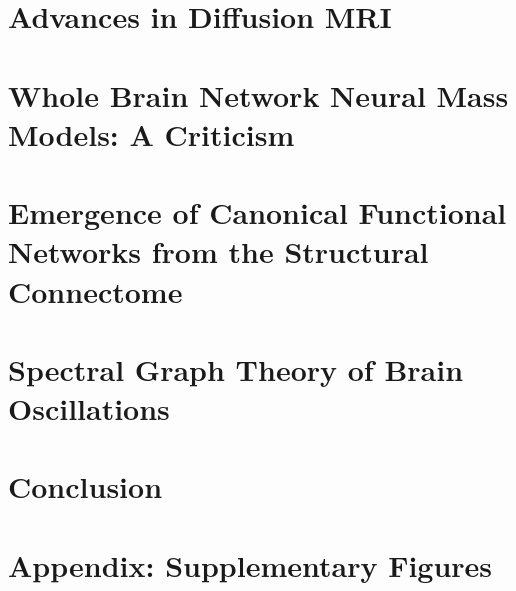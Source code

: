 \documentclass[phd,tocprelim]{cornell}
\begin{document}
\chapter{Advances in Diffusion MRI}
\label{chap:dwi}


\chapter{Whole Brain Network Neural Mass Models: A Criticism}
\label{chap:nmm}


\chapter{Emergence of Canonical Functional Networks from the Structural Connectome}
\label{chap:lap}


\chapter{Spectral Graph Theory of Brain Oscillations}
\label{chap:sgm}


\chapter{Conclusion}
\label{chap:conclusion}


\appendix
\chapter{Appendix: Supplementary Figures}



\end{document}
